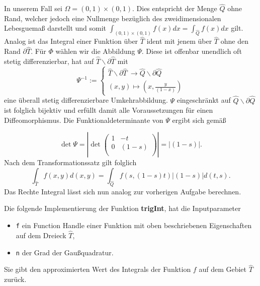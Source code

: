 \documentclass[a4paper,11pt,bibliography=totoc,listof=totoc,headinclude=true,cleardoublepage=empty,oneside]{scrbook}
\newcommand{\code}[1]{\texttt{\color{change}#1}}
\begin{document}
In unserem Fall sei $\Omega=(0,1)\times(0,1)$. Dies entspricht der Menge $\hat{Q}$ ohne Rand, welcher jedoch eine Nullmenge bezüglich des zweidimensionalen Lebesguemaß darstellt und somit $\int_{(0,1)\times(0,1)}f(x)dx = \int_{\hat{Q}}f(x)dx$ gilt. Analog ist das Integral einer Funktion über $\hat{T}$ ident mit jenem über $\hat{T}$ ohne den Rand $\partial\hat{T}$. Für $\Phi$ wählen wir die Abbildung $\Psi$. Diese ist offenbar unendlich oft stetig differenzierbar, hat auf $\hat{T}\backslash\partial\hat{T}$ mit 
\begin{equation*} 
	\Psi^{-1} := \begin{cases} 
	\hat{T}\backslash\partial\hat{T}\ \to \hat{Q}\backslash\partial\hat{Q} \\
	(x,y) \mapsto (x,\frac{y}{(1-x)})
	\end{cases} 
\end{equation*} 
eine überall stetig differenzierbare Umkehrabbildung. $\Psi$ eingeschränkt auf $\hat{Q}\backslash\partial\hat{Q}$ ist folglich bijektiv und erfüllt damit alle Voraussetzungen für einen Diffeomorphismus. Die Funktionaldeterminante von $\Psi$ ergibt sich gemäß
		
\begin{equation*}
	\det \Psi = |\det		
	\left(
	\begin{array}{cc}
	1 & -t \\
	0 & (1-s)\\
	\end{array}
	\right)| = |(1-s)|.
\end{equation*}
Nach dem Transformationssatz gilt folglich
\begin{equation*} \label{eq1}
	\int_{\hat{T}}f(x,y)d(x,y) = \int_{\hat{Q}}f(s,(1-s)t)|(1-s)|d(t,s).
\end{equation*}
Das Rechte Integral lässt sich nun analog zur vorherigen Aufgabe berechnen. 

Die folgende Implementierung der Funktion \textbf{trigInt}, hat die Inputparameter
\begin{itemize}
	\item \code{f} ein Function Handle einer Funktion mit oben beschriebenen Eigenschaften auf dem Dreieck $\hat{T}$,
	\item \code{n} der Grad der Gaußquadratur.
\end{itemize} 
Sie gibt den approximierten Wert des Integrals der Funktion $f$ auf dem Gebiet $\hat{T}$ zurück.
		
{\color{change}
\lstset{ 
	language=Matlab, 
	showstringspaces=false}
}
\end{document}
